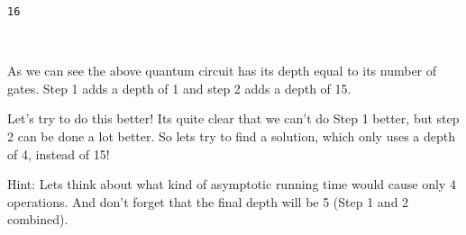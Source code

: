 \documentclass[11pt]{article}
\newcommand{\prompt}[4]{
        \ttfamily\llap{{\color{#2}[#3]:\hspace{3pt}#4}}\vspace{-\baselineskip}
    }
\begin{document}
    \begin{Verbatim}[commandchars=\\\{\}]
16
    \end{Verbatim}
 
            
\prompt{Out}{outcolor}{87}{}
    
    \begin{center}
    \end{center}
    { \hspace*{\fill} \\}
    

    As we can see the above quantum circuit has its depth equal to its
number of gates. Step 1 adds a depth of 1 and step 2 adds a depth of 15.

Let's try to do this better! Its quite clear that we can't do Step 1
better, but step 2 can be done a lot better. So lets try to find a
solution, which only uses a depth of 4, instead of 15!

Hint: Lets think about what kind of asymptotic running time would cause
only 4 operations. And don't forget that the final depth will be 5 (Step
1 and 2 combined).
\end{document}
